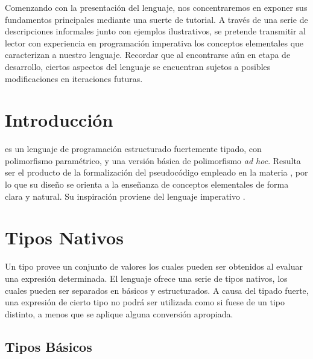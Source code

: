 
Comenzando con la presentación del lenguaje, nos concentraremos en exponer sus fundamentos principales mediante una suerte de tutorial.
A través de una serie de descripciones informales junto con ejemplos ilustrativos, se pretende transmitir al lector con experiencia en programación imperativa los conceptos elementales que caracterizan a nuestro lenguaje.
Recordar que al encontrarse aún en etapa de desarrollo, ciertos aspectos del lenguaje se encuentran sujetos a posibles modificaciones en iteraciones futuras.

\section{Introducción}

\Lenguaje{} es un lenguaje de programación estructurado fuertemente tipado, con polimorfismo paramétrico, y una versión básica de polimorfismo \textit{ad hoc}.
Resulta ser el producto de la formalización del pseudocódigo empleado en la materia \Materia{}, por lo que su diseño se orienta a la enseñanza de conceptos elementales de forma clara y natural.
Su inspiración proviene del lenguaje imperativo \Pascal{}.

\section{Tipos Nativos}

Un tipo provee un conjunto de valores los cuales pueden ser obtenidos al evaluar una expresión determinada.
El lenguaje ofrece una serie de tipos nativos, los cuales pueden ser separados en básicos y estructurados.
A causa del tipado fuerte, una expresión de cierto tipo no podrá ser utilizada como si fuese de un tipo distinto, a menos que se aplique alguna conversión apropiada.

\subsection{Tipos Básicos}

